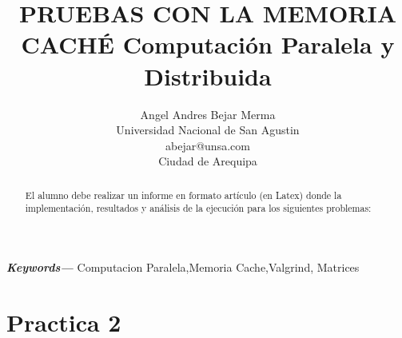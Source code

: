 \documentclass{article}
\title{PRUEBAS CON LA MEMORIA CACHÉ
Computación Paralela y Distribuida}
\author{Angel Andres Bejar Merma\\
  \small Universidad Nacional de San Agustin\\
  \small abejar@unsa.com\\
  \small Ciudad de Arequipa
}
\providecommand{\keywords}[1]
{
  \small	
  \textbf{\textit{Keywords---}} #1
}
\begin{document}
    \maketitle



  \begin{abstract}
    El alumno debe realizar un informe en formato artículo (en Latex) donde la implementación, resultados y análisis de la ejecución para los siguientes problemas:
  \end{abstract}
    
  \keywords{Computacion Paralela,Memoria Cache,Valgrind, Matrices }





\section{Practica 2}
\end{document}
